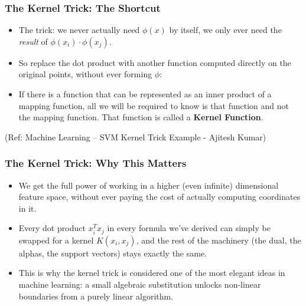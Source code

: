 \begin{frame}[fragile] \frametitle{The Kernel Trick: The Shortcut}

\begin{itemize}
\item The trick: we never actually need $\phi(x)$ by itself, we only ever need the \emph{result} of $\phi(x_i)\cdot\phi(x_j)$.
\item So replace the dot product with another function computed directly on the original points, without ever forming $\phi$:
\end{itemize}
\begin{center}
\end{center}
\begin{itemize}
\item If there is a function that can be represented as an inner product of a mapping function, all we will be required to know is that function and not the mapping function. That function is called a \textbf{Kernel Function}.
\end{itemize}

{\tiny (Ref: Machine Learning – SVM Kernel Trick Example - Ajitesh Kumar)}
\end{frame}

\begin{frame}[fragile] \frametitle{The Kernel Trick: Why This Matters}
\begin{itemize}
\item We get the full power of working in a higher (even infinite) dimensional feature space, without ever paying the cost of actually computing coordinates in it.
\item Every dot product $x_i^Tx_j$ in every formula we've derived can simply be swapped for a kernel $K(x_i,x_j)$, and the rest of the machinery (the dual, the alphas, the support vectors) stays exactly the same.
\item This is why the kernel trick is considered one of the most elegant ideas in machine learning: a small algebraic substitution unlocks non-linear boundaries from a purely linear algorithm.
\end{itemize}
\end{frame}

